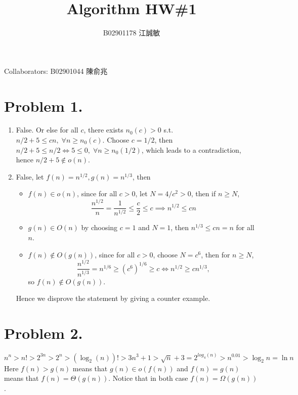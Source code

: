 \documentclass[12pt, a4paper]{article}
\title{Algorithm HW\#1}
\author{B02901178 江誠敏}
\begin{document}
\maketitle
Collaborators: B02901044 陳俞兆
\section{Problem 1.}
\begin{enumerate}
  \item False. Or else for all $c$, there exists $n_0(c) > 0$ s.t. $n/2 + 5 \leq cn, \; \forall n \geq n_0(c)$.
    Choose $c = 1/2$, then $n/2 + 5 \leq n/2 \iff 5 \leq 0,\; \forall n \geq n_0(1/2)$, which leads to 
    a contradiction, hence $n/2 + 5 \notin o(n)$.
  \item False, let $f(n) = n^{1/2}, g(n) = n^{1/3}$, then 
    \begin{itemize}
      \item $f(n) \in o(n)$, since for all $c > 0$, let $N = 4/c^2 > 0$, then if $n \geq N$, 
        \[ \frac{n^{1/2}}{n} = \frac{1}{n^{1/2}} \leq \frac{c}{2} \leq c
          \implies n^{1/2} \leq cn \]
      \item $g(n) \in O(n)$ by choosing $c = 1$ and $N = 1$, then $n^{1/3} \leq cn = n$ for all $n$.
      \item $f(n) \notin O(g(n))$, since for all $c > 0$, choose $N = c^6$, then for $n \geq N$, 
        \[ \frac{n^{1/2}}{n^{1/3}} = n^{1/6} \geq \left( c^6 \right)^{1/6} \geq c
          \iff n^{1/2} \geq c n^{1/3}, \]
        so $f(n) \notin O(g(n))$.
    \end{itemize}
    Hence we disprove the statement by giving a counter example.
\end{enumerate}

\section{Problem 2.}
\[ n^n > n! > 2^{3n} > 2^n > (\log_2(n))! > 3n^3 + 1 > \sqrt{n} + 3 = 2^{log_4(n)} > n^{0.01} > \log_2 n = \ln n \]
Here $f(n) > g(n)$ means that $g(n) \in o(f(n))$ and $f(n) = g(n)$ means that $f(n) = \Theta(g(n))$.
Notice that in both case $f(n) = \Omega(g(n))$.
\end{document}
